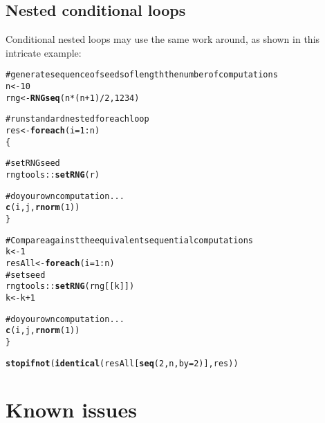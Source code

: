 \documentclass[a4paper,12pt]{article}\usepackage{graphicx, color}
\makeatletter
\newcommand{\hlfunctioncall}[1]{\textcolor[rgb]{0.501960784313725,0,0.329411764705882}{\textbf{#1}}}%
\newcommand{\hlcomment}[1]{\textcolor[rgb]{0.180392156862745,0.6,0.341176470588235}{#1}}%
\newenvironment{kframe}{%
 \def\at@end@of@kframe{}%
 \ifinner\ifhmode%
  \def\at@end@of@kframe{\end{minipage}}%
  \begin{minipage}{\columnwidth}%
 \fi\fi%
 \def\FrameCommand##1{\hskip\@totalleftmargin \hskip-\fboxsep
 \colorbox{shadecolor}{##1}\hskip-\fboxsep
     \hskip-\linewidth \hskip-\@totalleftmargin \hskip\columnwidth}%
 \MakeFramed {\advance\hsize-\width
   \@totalleftmargin\z@ \linewidth\hsize
   \@setminipage}}%
 {\par\unskip\endMakeFramed%
 \at@end@of@kframe}
\newenvironment{knitrout}{}{} %
\renewenvironment{knitrout}{\begin{footnotesize}}{\end{footnotesize}}
\makeatother
\begin{document}
\subsection{Nested conditional loops}

Conditional nested loops may use the same work around, as shown in this intricate 
example:

\begin{knitrout}
\color{fgcolor}\begin{kframe}
\begin{alltt}
\hlcomment{# generate sequence of seeds of length the number of computations}
n <- 10
rng <- \hlfunctioncall{RNGseq}(n * (n + 1)/2, 1234)

\hlcomment{# run standard nested foreach loop}
res <- \hlfunctioncall{foreach}(i = 1:n) %:% \hlfunctioncall{when}(i%%2 == 0) %:% \hlfunctioncall{foreach}(j = 1:i, r = rng[(i - 1) * i/2 + 1:i]) %dopar% 
    \{
        
        \hlcomment{# set RNG seed}
        rngtools::\hlfunctioncall{setRNG}(r)
        
        \hlcomment{# do your own computation ...}
        \hlfunctioncall{c}(i, j, \hlfunctioncall{rnorm}(1))
    \}

\hlcomment{# Compare against the equivalent sequential computations}
k <- 1
resAll <- \hlfunctioncall{foreach}(i = 1:n) %:% \hlfunctioncall{foreach}(j = 1:i) %do% \{
    \hlcomment{# set seed}
    rngtools::\hlfunctioncall{setRNG}(rng[[k]])
    k <- k + 1
    
    \hlcomment{# do your own computation ...}
    \hlfunctioncall{c}(i, j, \hlfunctioncall{rnorm}(1))
\}

\hlfunctioncall{stopifnot}(\hlfunctioncall{identical}(resAll[\hlfunctioncall{seq}(2, n, by = 2)], res))
\end{alltt}
\end{kframe}
\end{knitrout}


\section{Known issues}
\label{sec:issues}
\end{document}
